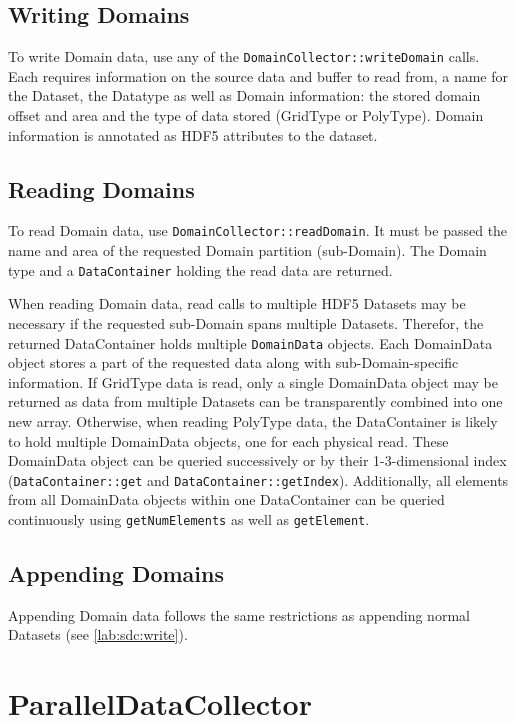 \documentclass[a4paper,10pt,BCOR12mm]{report}
\newcommand{\code}[1]{\small \texttt{#1}}
\begin{document}
\section{Writing Domains}

To write Domain data, use any of the \code{DomainCollector::writeDomain} calls.
Each requires information on the source data and buffer to read from, a name for the Dataset, the Datatype as well as
Domain information: the stored domain offset and area and the type of data stored (GridType or PolyType).
Domain information is annotated as HDF5 attributes to the dataset.

\section{Reading Domains}

To read Domain data, use \code{DomainCollector::readDomain}.
It must be passed the name and area of the requested Domain partition (sub-Domain).
The Domain type and a \code{DataContainer} holding the read data are returned.

When reading Domain data, read calls to multiple HDF5 Datasets may be necessary if the requested
sub-Domain spans multiple Datasets. Therefor, the returned DataContainer holds multiple
\code{DomainData} objects.
Each DomainData object stores a part of the requested data along with sub-Domain-specific information.
If GridType data is read, only a single DomainData object may be returned as data from multiple Datasets can
be transparently combined into one new array.
Otherwise, when reading PolyType data, the DataContainer is likely to hold multiple DomainData objects, one for
each physical read.
These DomainData object can be queried successively or by their 1-3-dimensional index
(\code{DataContainer::get} and \code{DataContainer::getIndex}).
Additionally, all elements from all DomainData objects within one DataContainer can be
queried continuously using \code{getNumElements} as well as
\code{getElement}.


\section{Appending Domains}

Appending Domain data follows the same restrictions as appending normal Datasets (see \ref{lab:sdc:write}).



\chapter{ParallelDataCollector}
\end{document}
